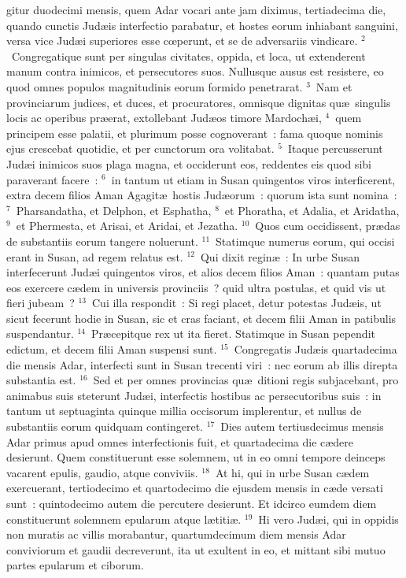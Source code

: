 \bchapter
{}gitur duodecimi mensis, quem Adar vocari ante jam diximus, tertiadecima die, quando cunctis Jud\ae is interfectio parabatur, et hostes eorum inhiabant sanguini, versa vice Jud\ae i superiores esse cœperunt, et se de adversariis vindicare.
${}^{2}$~Congregatique sunt per singulas civitates, oppida, et loca, ut extenderent manum contra inimicos, et persecutores suos. Nullusque ausus est resistere, eo quod omnes populos magnitudinis eorum formido penetrarat.
${}^{3}$~Nam et provinciarum judices, et duces, et procuratores, omnisque dignitas qu\ae\ singulis locis ac operibus pr\ae erat, extollebant Jud\ae os timore Mardoch\ae i,
${}^{4}$~quem principem esse palatii, et plurimum posse cognoverant~: fama quoque nominis ejus crescebat quotidie, et per cunctorum ora volitabat.
${}^{5}$~Itaque percusserunt Jud\ae i inimicos suos plaga magna, et occiderunt eos, reddentes eis quod sibi paraverant facere~:
${}^{6}$~in tantum ut etiam in Susan quingentos viros interficerent, extra decem filios Aman Agagit\ae\ hostis Jud\ae orum~: quorum ista sunt nomina~:
${}^{7}$~Pharsandatha, et Delphon, et Esphatha,
${}^{8}$~et Phoratha, et Adalia, et Aridatha,
${}^{9}$~et Phermesta, et Arisai, et Aridai, et Jezatha.
${}^{10}$~Quos cum occidissent, pr\ae das de substantiis eorum tangere noluerunt.
${}^{11}$~Statimque numerus eorum, qui occisi erant in Susan, ad regem relatus est.
${}^{12}$~Qui dixit regin\ae~: In urbe Susan interfecerunt Jud\ae i quingentos viros, et alios decem filios Aman~: quantam putas eos exercere c\ae dem in universis provinciis~? quid ultra postulas, et quid vis ut fieri jubeam~?
${}^{13}$~Cui illa respondit~: Si regi placet, detur potestas Jud\ae is, ut sicut fecerunt hodie in Susan, sic et cras faciant, et decem filii Aman in patibulis suspendantur.
${}^{14}$~Pr\ae cepitque rex ut ita fieret. Statimque in Susan pependit edictum, et decem filii Aman suspensi sunt.
${}^{15}$~Congregatis Jud\ae is quartadecima die mensis Adar, interfecti sunt in Susan trecenti viri~: nec eorum ab illis direpta substantia est.
${}^{16}$~Sed et per omnes provincias qu\ae\ ditioni regis subjacebant, pro animabus suis steterunt Jud\ae i, interfectis hostibus ac persecutoribus suis~: in tantum ut septuaginta quinque millia occisorum implerentur, et nullus de substantiis eorum quidquam contingeret.
${}^{17}$~Dies autem tertiusdecimus mensis Adar primus apud omnes interfectionis fuit, et quartadecima die c\ae dere desierunt. Quem constituerunt esse solemnem, ut in eo omni tempore deinceps vacarent epulis, gaudio, atque conviviis.
${}^{18}$~At hi, qui in urbe Susan c\ae dem exercuerant, tertiodecimo et quartodecimo die ejusdem mensis in c\ae de versati sunt~: quintodecimo autem die percutere desierunt. Et idcirco eumdem diem constituerunt solemnem epularum atque l\ae titi\ae .
${}^{19}$~Hi vero Jud\ae i, qui in oppidis non muratis ac villis morabantur, quartumdecimum diem mensis Adar conviviorum et gaudii decreverunt, ita ut exultent in eo, et mittant sibi mutuo partes epularum et ciborum.


